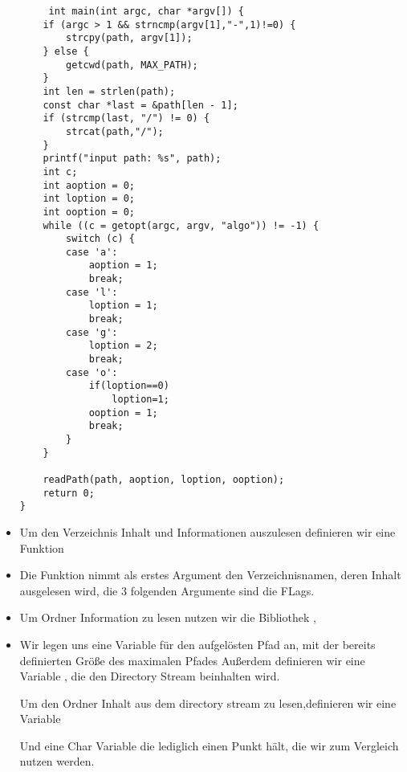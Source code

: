 \begin{itemize}
 \begin{lstlisting}
	 int main(int argc, char *argv[]) {
	if (argc > 1 && strncmp(argv[1],"-",1)!=0) {
		strcpy(path, argv[1]);
	} else {
		getcwd(path, MAX_PATH);
	}
	int len = strlen(path);
	const char *last = &path[len - 1];
	if (strcmp(last, "/") != 0) {
		strcat(path,"/");
	}
	printf("input path: %s", path);
	int c;
	int aoption = 0;
	int loption = 0;
	int ooption = 0;
	while ((c = getopt(argc, argv, "algo")) != -1) {
		switch (c) {
		case 'a':
			aoption = 1;
			break;
		case 'l':
			loption = 1;
			break;
		case 'g':
			loption = 2;
			break;
		case 'o':
			if(loption==0)
				loption=1;
			ooption = 1;
			break;
		}
	}

	readPath(path, aoption, loption, ooption);
	return 0;
}
 \end{lstlisting}
\item Um den Verzeichnis Inhalt und Informationen auszulesen definieren wir eine Funktion


\item Die Funktion nimmt als erstes Argument den Verzeichnisnamen, deren Inhalt ausgelesen wird,
die 3 folgenden Argumente sind die FLags.
\item Um Ordner Information zu lesen nutzen wir die Bibliothek ,
\item Wir legen uns eine Variable für den aufgelösten Pfad an, mit der
bereits definierten Größe des maximalen Pfades
Außerdem definieren wir eine Variable  ,
die den Directory Stream beinhalten wird.

Um den Ordner Inhalt aus dem directory stream zu lesen,definieren wir eine Variable


Und eine Char Variable die lediglich einen Punkt hält, die wir zum Vergleich
nutzen werden.


\end{itemize}
